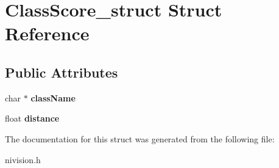 \hypertarget{structClassScore__struct}{\section{\-Class\-Score\-\_\-struct \-Struct \-Reference}
\label{structClassScore__struct}
}
\subsection*{\-Public \-Attributes}
\begin{DoxyCompactItemize}
\item 
\hypertarget{structClassScore__struct_a07f86f7b9c0ba81aeec633ea4183cd4e}{char $\ast$ {\bfseries class\-Name}}\label{structClassScore__struct_a07f86f7b9c0ba81aeec633ea4183cd4e}

\item 
\hypertarget{structClassScore__struct_a42c180b379cef0f68d6fb197a7f3e349}{float {\bfseries distance}}\label{structClassScore__struct_a42c180b379cef0f68d6fb197a7f3e349}

\end{DoxyCompactItemize}


\-The documentation for this struct was generated from the following file\-:\begin{DoxyCompactItemize}
\item 
nivision.\-h\end{DoxyCompactItemize}
